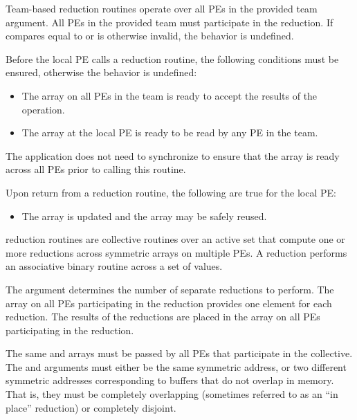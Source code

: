 \begin{apidefinition}
{    Team-based reduction routines operate over all \acp{PE} in the provided team argument. All
    \acp{PE} in the provided team must participate in the reduction.
    If  compares equal to  or is
    otherwise invalid, the behavior is undefined.

    Before the local \ac{PE} calls a reduction routine, the following conditions
    must be ensured, otherwise the behavior is undefined:
    \begin{itemize}
        \item The \dest{} array on all \acp{PE} in the team is ready to
            accept the results of the operation.
        \item The \source{} array at the local \ac{PE} is ready to be read by
            any \ac{PE} in the team.
    \end{itemize}
    The application does not need to synchronize to ensure that the \source{}
    array is ready across all \acp{PE} prior to calling this routine.
    
    Upon return from a reduction routine, the following are true for the local
    \ac{PE}:
    \begin{itemize}
    \item The \dest{} array is updated and the \source{} array may be safely reused.
    \end{itemize}

\begin{DeprecateBlock}
    \openshmem reduction routines are collective routines over an active set 
	that compute one or more reductions across symmetric
    arrays on multiple \acp{PE}.  A reduction performs an associative binary routine
    across a set of values.

    The  argument determines the number of separate reductions to
    perform.  The \source{} array on all \acp{PE} participating in the reduction
    provides one element for each reduction.  The results of the reductions are placed in the
    \dest{} array on all \acp{PE} participating in the reduction.

    The same \source{} and \dest{} arrays must be passed by all PEs that
    participate in the collective.
    The \source{} and \dest{} arguments must either be the same symmetric
    address, or two different symmetric addresses corresponding to buffers that
    do not overlap in memory. That is, they must be completely overlapping (sometimes referred to as an ``in place'' reduction) or
    completely disjoint.


\end{DeprecateBlock}}
\end{apidefinition}
